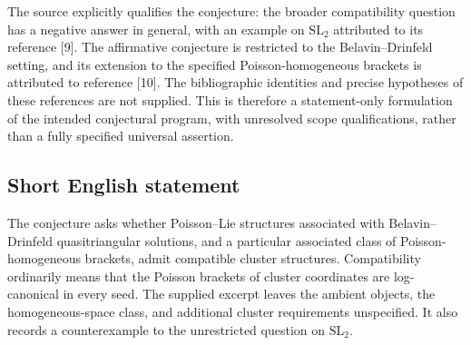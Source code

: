 \documentclass[11pt]{article}
\begin{document}
The source explicitly qualifies the conjecture: the broader compatibility question has a negative answer in general, with an example on \(\mathrm{SL}_2\) attributed to its reference [9]. The affirmative conjecture is restricted to the Belavin--Drinfeld setting, and its extension to the specified Poisson-homogeneous brackets is attributed to reference [10]. The bibliographic identities and precise hypotheses of these references are not supplied. This is therefore a statement-only formulation of the intended conjectural program, with unresolved scope qualifications, rather than a fully specified universal assertion.
\subsection{Short English statement}
The conjecture asks whether Poisson--Lie structures associated with Belavin--Drinfeld quasitriangular solutions, and a particular associated class of Poisson-homogeneous brackets, admit compatible cluster structures. Compatibility ordinarily means that the Poisson brackets of cluster coordinates are log-canonical in every seed. The supplied excerpt leaves the ambient objects, the homogeneous-space class, and additional cluster requirements unspecified. It also records a counterexample to the unrestricted question on \(\mathrm{SL}_2\).
\end{document}

